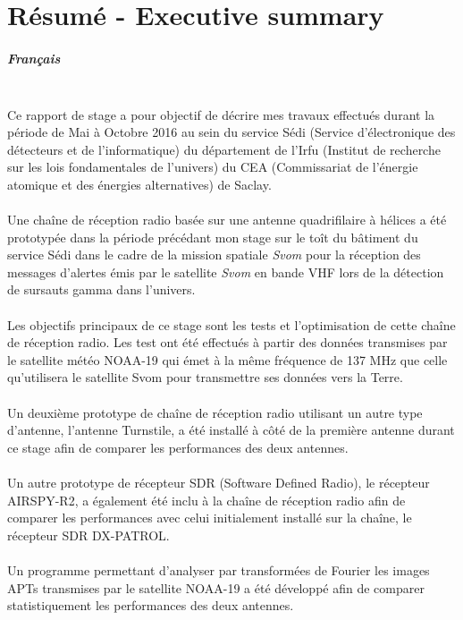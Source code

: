 \documentclass[12pt,fleqn]{book} %
\begin{document}
\pagestyle{fancy} %
\setcounter{part}{-1}
\part{Résumé - Executive summary}
\subsubsection{Français}
~\\\indent Ce rapport de stage a pour objectif de décrire mes travaux effectués durant la période de Mai à Octobre 2016 au sein du service Sédi (Service d'électronique des détecteurs et de l'informatique) du département de l'Irfu (Institut de recherche sur les lois fondamentales de l'univers) du CEA (Commissariat de l'énergie atomique et des énergies alternatives) de Saclay.
~\\\\Une chaîne de réception radio basée sur une antenne quadrifilaire à hélices a été prototypée dans la période précédant mon stage sur le toît du bâtiment du service Sédi dans le cadre de la mission spatiale \emph{Svom} pour la réception des messages d'alertes émis par le satellite \emph{Svom} en bande VHF lors de la détection de sursauts gamma dans l'univers. 
~\\\\Les objectifs principaux de ce stage sont les tests et l'optimisation de cette chaîne de réception radio. Les test ont été effectués à partir des données transmises par le satellite météo NOAA-19 qui émet à la même fréquence de 137 MHz que celle qu'utilisera le satellite Svom pour transmettre ses données vers la Terre.
~\\\\Un deuxième prototype de chaîne de réception radio utilisant un autre type d'antenne, l'antenne Turnstile, a été installé à côté de la première antenne durant ce stage afin de comparer les performances des deux antennes. 
~\\\\Un autre prototype de récepteur SDR (Software Defined Radio), le récepteur AIRSPY-R2, a également été inclu à la chaîne de réception radio afin de comparer les performances avec celui initialement installé sur la chaîne, le récepteur SDR DX-PATROL.
~\\\\Un programme permettant d'analyser par transformées de Fourier les images APTs transmises par le satellite NOAA-19 a été développé afin de comparer statistiquement les performances des deux antennes.
\end{document}
